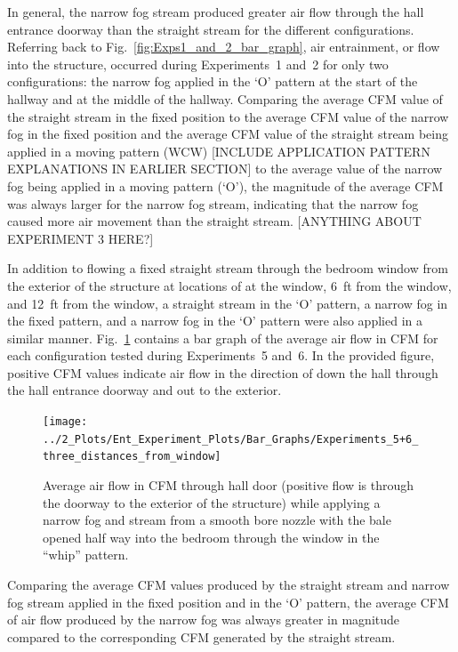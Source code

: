 \documentclass[12pt,oneside]{book}
\begin{document}
In general, the narrow fog stream produced greater air flow through the hall entrance doorway than the straight stream for the different configurations. Referring back to Fig.~\ref{fig:Exps1_and_2_bar_graph}, air entrainment, or flow into the structure, occurred during Experiments~1 and~2 for only two configurations: the narrow fog applied in the `O' pattern at the start of the hallway and at the middle of the hallway. Comparing the average CFM value of the straight stream in the fixed position to the average CFM value of the narrow fog in the fixed position and the average CFM value of the straight stream being applied in a moving pattern (WCW) [INCLUDE APPLICATION PATTERN EXPLANATIONS IN EARLIER SECTION] to the average value of the narrow fog being applied in a moving pattern (`O'), the magnitude of the average CFM was always larger for the narrow fog stream, indicating that the narrow fog caused more air movement than the straight stream. [ANYTHING ABOUT EXPERIMENT 3 HERE?] 

In addition to flowing a fixed straight stream through the bedroom window from the exterior of the structure at locations of at the window, 6~ft from the window, and 12~ft from the window, a straight stream in the `O' pattern, a narrow fog in the fixed pattern, and a narrow fog in the `O' pattern were also applied in a similar manner. Fig.~\ref{fig:Exps5_and_6_three_distances} contains a bar graph of the average air flow in CFM for each configuration tested during Experiments~5 and~6. In the provided figure, positive CFM values indicate air flow in the direction of down the hall through the hall entrance doorway and out to the exterior.  

\begin{figure}[!ht]
	\centering
	\texttt{[image: ../2\_Plots/Ent\_Experiment\_Plots/Bar\_Graphs/Experiments\_5+6\_three\_distances\_from\_window]}
	\caption{Average air flow in CFM through hall door (positive flow is through the doorway to the exterior of the structure) while applying a narrow fog and stream from a smooth bore nozzle with the bale opened half way into the bedroom through the window in the ``whip'' pattern.}
	\label{fig:Exps5_and_6_three_distances}
\end{figure}

Comparing the average CFM values produced by the straight stream and narrow fog stream applied in the fixed position and in the `O' pattern, the average CFM of air flow produced by the narrow fog was always greater in magnitude compared to the corresponding CFM generated by the straight stream.
\end{document}
